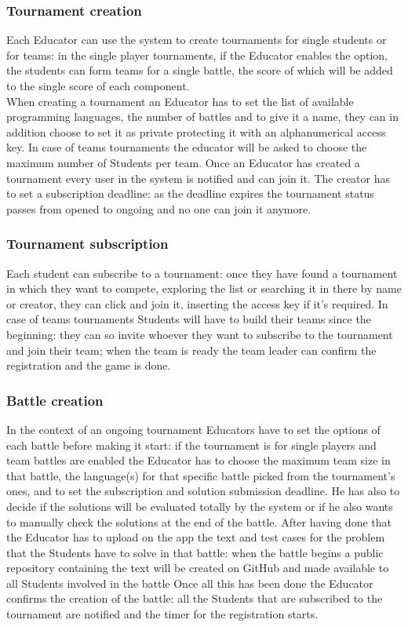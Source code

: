 \documentclass{article}
\begin{document}
\subsubsection{Tournament creation}
Each Educator can use the system to create tournaments for single students or for teams: in the single player tournaments, if the Educator enables the option, the students can form teams for a single battle, the score of which will be added to the single score of each component.\\
When creating a tournament an Educator has to set the list of available programming languages, the number of battles and to give it a name, they can in addition choose to set it as private protecting it with an alphanumerical access key.
In case of teams tournaments the educator will be asked to choose the maximum number of Students per team.
Once an Educator has created a tournament every user in the system is notified and can join it.
The creator has to set a subscription deadline: as the deadline expires the tournament status passes from opened to ongoing and no one can join it anymore.
\subsubsection{Tournament subscription}
Each student can subscribe to a tournament: once they have found a tournament in which they want to compete, exploring the list or searching it in there by name or creator, they can click and join it, inserting the access key if it's required. 
In case of teams tournaments Students will have to build their teams since the beginning: they can so invite whoever they want to subscribe to the tournament and join their team; when the team is ready the team leader can confirm the registration and the game is done.
\subsubsection{Battle creation}
In the context of an ongoing tournament Educators have to set the options of each battle before making it start: if the tournament is for single players and team battles are enabled the Educator has to choose the maximum team size in that battle, the language(s) for that specific battle picked from the tournament's ones, and to set the subscription and solution submission deadline.
He has also to decide if the solutions will be evaluated totally by the system or if he also wants to manually check the solutions at the end of the battle.
After having done that the Educator has to upload on the app the text and test cases for the problem that the Students have to solve in that battle: when the battle begins a public repository containing the text will be created on GitHub and made available to all Students involved in the battle
Once all this has been done the Educator confirms the creation of the battle: all the Students that are subscribed to the tournament are notified and the timer for the registration starts.
\end{document}
